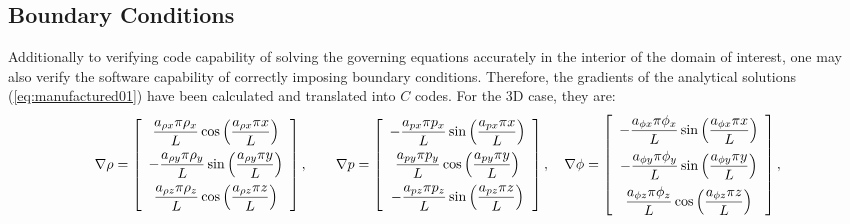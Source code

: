 \documentclass[10pt]{article}
\begin{document}
\subsection{Boundary Conditions}
Additionally to verifying code capability of solving the governing equations accurately in the interior of the domain of interest, one may also verify the software capability of correctly imposing boundary conditions. Therefore, the gradients of the  analytical solutions (\ref{eq:manufactured01}) have been calculated and translated into $C$ codes. For the 3D case, they are:
\begin{equation*}
\nabla  \rho= \left[ \begin{array}{c}
 \dfrac{  a_{\rho x}  \pi \rho_x}{L} \cos\left( \dfrac{ a_{\rho x}  \pi  x}{L}\right)\vspace{5pt} \\
-\dfrac{  a_{\rho y}  \pi \rho_y}{L} \sin\left( \dfrac{ a_{\rho y}  \pi  y}{L}\right)\vspace{5pt}\\
 \dfrac{  a_{\rho z}  \pi \rho_z}{L}  \cos\left( \dfrac{ a_{\rho z}  \pi  z}{L}\right)
\end{array} \right],
\qquad
\nabla p = \left[ \begin{array}{c}
- \dfrac{  a_{px}  \pi p_x}{L} \sin\left( \dfrac{ a_{px}  \pi  x}{L}\right)\vspace{5pt}\\
  \dfrac{  a_{py}  \pi p_y}{L} \cos\left( \dfrac{ a_{py}  \pi  y}{L}\right) \vspace{5pt}\\
- \dfrac{  a_{pz}  \pi p_z}{L} \sin\left( \dfrac{ a_{pz}  \pi  z}{L}\right)
\end{array} \right],
\quad
\nabla \phi = \left[ \begin{array}{c} 
- \dfrac{a_{\phi x} \pi  \phi_{x} }{L}\sin\left(\dfrac{a_{\phi x} \pi  x}{L}\right)\vspace{5pt}\\
- \dfrac{a_{\phi y} \pi  \phi_{y} }{L}\sin\left(\dfrac{a_{\phi y} \pi  y}{L}\right)\vspace{5pt}\\ 
  \dfrac{a_{\phi z} \pi  \phi_{z} }{L}\cos\left(\dfrac{a_{\phi z} \pi  z}{L}\right)
\end{array} \right],
\end{equation*}
%
\end{document}
